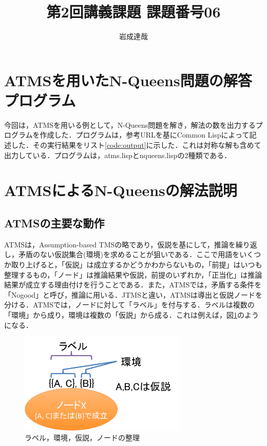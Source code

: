 \documentclass{jarticle}
\title{第2回講義課題 課題番号06}
\date{\todayd}
\author{岩成達哉}
\begin{document}
\begin{titlepage}
	\setlength{\topmargin}{1.1in}
	\vspace{100mm}
	\maketitle
\end{titlepage}


\section{ATMSを用いたN-Queens問題の解答プログラム}
今回は，ATMSを用いる例として，N-Queens問題を解き，解法の数を出力するプログラムを作成した．プログラムは，参考URL\cite{ref:atms}\cite{ref:nqueen}を基にCommon Lispによって記述した．その実行結果をリスト\ref{code:output}に示した．これは対称な解も含めて出力している．プログラムは，atms.lispとnqueens.lispの2種類である．

\lstset{style=customplain}




\section{ATMSによるN-Queensの解法説明}
\subsection{ATMSの主要な動作}

ATMSは，Assumption-based TMSの略であり，仮説を基にして，推論を繰り返し，矛盾のない仮説集合(環境)を求めることが狙いである．ここで用語をいくつか取り上げると，「仮説」は成立するかどうかわからないもの，「前提」はいつも整理するもの，「ノード」は推論結果や仮説，前提のいずれか，「正当化」は推論結果が成立する理由付けを行うことである．また，ATMSでは，矛盾する条件を「Nogood」と呼び，推論に用いる．JTMSと違い，ATMSは導出と仮説ノードを分ける\cite{ref:atms_basic}．ATMSでは，ノードに対して「ラベル」を付与する．ラベルは複数の「環境」から成り，環境は複数の「仮説」から成る\cite{ref:atms_label}．これは例えば，図\ref{fig:label}のようになる\cite{ref:atms_label}．

\begin{figure}[H]
	\begin{center}
	\includegraphics[width=80mm]{image/label.png}
	\caption{ラベル，環境，仮説，ノードの整理}
	\label{fig:label}
	\end{center}
\end{figure}
\end{document}
